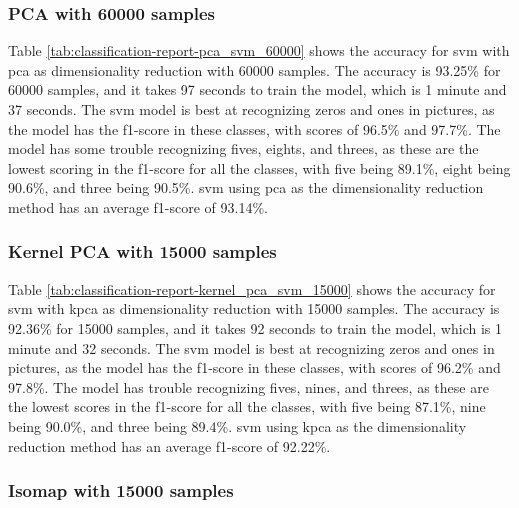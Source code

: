 \subsubsection{PCA with 60000 samples}\label{subsubsec:experiment-1-results-pca-60000}

Table \ref{tab:classification-report-pca_svm_60000} shows the accuracy for \gls{svm} with \gls{pca} as dimensionality reduction with 60000 samples. The accuracy is 93.25\% for 60000 samples, and it takes 97 seconds to train the model, which is 1 minute and 37 seconds. The \gls{svm} model is best at recognizing zeros and ones in pictures, as the model has the f1-score in these classes, with scores of 96.5\% and 97.7\%. The model has some trouble recognizing fives, eights, and threes, as these are the lowest scoring in the f1-score for all the classes, with five being 89.1\%, eight being 90.6\%, and three being 90.5\%. \gls{svm} using \gls{pca} as the dimensionality reduction method has an average f1-score of 93.14\%.

\subsubsection{Kernel PCA with 15000 samples}\label{subsubsec:experiment-1-results-kernel_pca-15000}

Table \ref{tab:classification-report-kernel_pca_svm_15000} shows the accuracy for \gls{svm} with \gls{kpca} as dimensionality reduction with 15000 samples. The accuracy is 92.36\% for 15000 samples, and it takes 92 seconds to train the model, which is 1 minute and 32 seconds. The \gls{svm} model is best at recognizing zeros and ones in pictures, as the model has the f1-score in these classes, with scores of 96.2\% and 97.8\%. The model has trouble recognizing fives, nines, and threes, as these are the lowest scores in the f1-score for all the classes, with five being 87.1\%, nine being 90.0\%, and three being 89.4\%. \gls{svm} using \gls{kpca} as the dimensionality reduction method has an average f1-score of 92.22\%.

\subsubsection{Isomap with 15000 samples}\label{subsubsec:experiment-1-results-isomap-15000}

